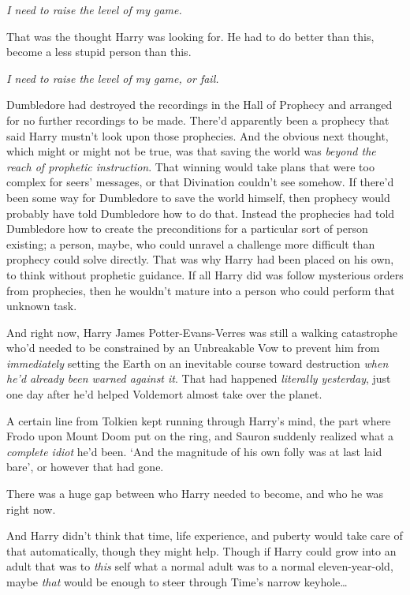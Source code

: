 \emph{I need to raise the level of my game.}

That was the thought Harry was looking for. He had to do better than this, become a less stupid person than this.

\emph{I need to raise the level of my game, or fail.}

Dumbledore had destroyed the recordings in the Hall of Prophecy and arranged for no further recordings to be made. There'd apparently been a prophecy that said Harry mustn't look upon those prophecies. And the obvious next thought, which might or might not be true, was that saving the world was \emph{beyond the reach of prophetic instruction}. That winning would take plans that were too complex for seers' messages, or that Divination couldn't see somehow. If there'd been some way for Dumbledore to save the world himself, then prophecy would probably have told Dumbledore how to do that. Instead the prophecies had told Dumbledore how to create the preconditions for a particular sort of person existing; a person, maybe, who could unravel a challenge more difficult than prophecy could solve directly. That was why Harry had been placed on his own, to think without prophetic guidance. If all Harry did was follow mysterious orders from prophecies, then he wouldn't mature into a person who could perform that unknown task.

And right now, Harry James Potter-Evans-Verres was still a walking catastrophe who'd needed to be constrained by an Unbreakable Vow to prevent him from \emph{immediately} setting the Earth on an inevitable course toward destruction \emph{when he'd already been warned against it}. That had happened \emph{literally yesterday}, just one day after he'd helped Voldemort almost take over the planet.

A certain line from Tolkien kept running through Harry's mind, the part where Frodo upon Mount Doom put on the ring, and Sauron suddenly realized what a \emph{complete idiot} he'd been. `And the magnitude of his own folly was at last laid bare', or however that had gone.

There was a huge gap between who Harry needed to become, and who he was right now.

And Harry didn't think that time, life experience, and puberty would take care of that automatically, though they might help. Though if Harry could grow into an adult that was to \emph{this} self what a normal adult was to a normal eleven-year-old, maybe \emph{that} would be enough to steer through Time's narrow keyhole{\ldots}

